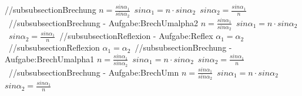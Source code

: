 //subsubsection{Brechung} 
$ n = \frac{sin\alpha _{1} }{sin\alpha _{2} } $\ 
$ sin\alpha _{1}  = n\cdot sin\alpha _{2} $\ 
$ sin\alpha _{2}  = \frac{sin\alpha _{1} }{ n} $\ 
//subsubsection{Brechung - Aufgabe:BrechUmalpha2} 
$ n = \frac{sin\alpha _{1} }{sin\alpha _{2} } $\ 
$ sin\alpha _{1}  = n\cdot sin\alpha _{2} $\ 
$ sin\alpha _{2}  = \frac{sin\alpha _{1} }{ n} $\ 
//subsubsection{Reflexion - Aufgabe:Reflex} 
$ \alpha _{1}  = \alpha _{2} $\ 
//subsubsection{Reflexion} 
$ \alpha _{1}  = \alpha _{2} $\ 
//subsubsection{Brechung - Aufgabe:BrechUmalpha1} 
$ n = \frac{sin\alpha _{1} }{sin\alpha _{2} } $\ 
$ sin\alpha _{1}  = n\cdot sin\alpha _{2} $\ 
$ sin\alpha _{2}  = \frac{sin\alpha _{1} }{ n} $\ 
//subsubsection{Brechung - Aufgabe:BrechUmn} 
$ n = \frac{sin\alpha _{1} }{sin\alpha _{2} } $\ 
$ sin\alpha _{1}  = n\cdot sin\alpha _{2} $\ 
$ sin\alpha _{2}  = \frac{sin\alpha _{1} }{ n} $\ 
